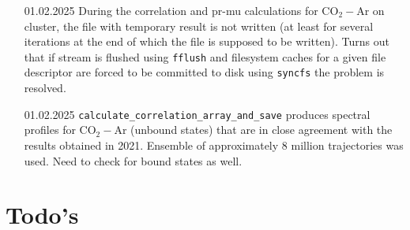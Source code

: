 \documentclass{article}
\begin{document}
\begin{enumerate}
    \item [01.02.2025] During the correlation and pr-mu calculations for CO$_2-$Ar on cluster, the file with temporary result is not written (at least for several iterations at the end of which the file is supposed to be written). Turns out that if stream is flushed using \texttt{fflush} and filesystem caches for a given file descriptor are forced to be committed to disk using \texttt{syncfs} the problem is resolved.
    \item [01.02.2025] \texttt{calculate\_correlation\_array\_and\_save} produces spectral profiles for CO$_2-$Ar (unbound states) that are in close agreement with the results obtained in 2021. Ensemble of approximately 8 million trajectories was used. {\color{red} Need to check for bound states as well.}
\end{enumerate}

\section{Todo's}
\end{document}
